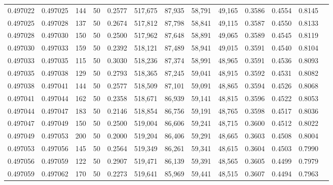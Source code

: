 \begin{tabular}{rrrrrrrrrrrrr}
0.497022 & 0.497025 &   144 &  50 &                                     0.2577 & 517,675 &  87,935 &  58,791 &  49,165 & 0.3586 & 0.4554 & 0.8145 \\
0.497025 & 0.497028 &   137 &  50 &                                     0.2674 & 517,812 &  87,798 &  58,841 &  49,115 & 0.3587 & 0.4550 & 0.8133 \\
0.497028 & 0.497030 &   150 &  50 &                                     0.2500 & 517,962 &  87,648 &  58,891 &  49,065 & 0.3589 & 0.4545 & 0.8119 \\
0.497030 & 0.497033 &   159 &  50 &                                     0.2392 & 518,121 &  87,489 &  58,941 &  49,015 & 0.3591 & 0.4540 & 0.8104 \\
0.497033 & 0.497035 &   115 &  50 &                                     0.3030 & 518,236 &  87,374 &  58,991 &  48,965 & 0.3591 & 0.4536 & 0.8093 \\
0.497035 & 0.497038 &   129 &  50 &                                     0.2793 & 518,365 &  87,245 &  59,041 &  48,915 & 0.3592 & 0.4531 & 0.8082 \\
0.497038 & 0.497041 &   144 &  50 &                                     0.2577 & 518,509 &  87,101 &  59,091 &  48,865 & 0.3594 & 0.4526 & 0.8068 \\
0.497041 & 0.497044 &   162 &  50 &                                     0.2358 & 518,671 &  86,939 &  59,141 &  48,815 & 0.3596 & 0.4522 & 0.8053 \\
0.497044 & 0.497047 &   183 &  50 &                                     0.2146 & 518,854 &  86,756 &  59,191 &  48,765 & 0.3598 & 0.4517 & 0.8036 \\
0.497047 & 0.497049 &   150 &  50 &                                     0.2500 & 519,004 &  86,606 &  59,241 &  48,715 & 0.3600 & 0.4512 & 0.8022 \\
0.497049 & 0.497053 &   200 &  50 &                                     0.2000 & 519,204 &  86,406 &  59,291 &  48,665 & 0.3603 & 0.4508 & 0.8004 \\
0.497053 & 0.497056 &   145 &  50 &                                     0.2564 & 519,349 &  86,261 &  59,341 &  48,615 & 0.3604 & 0.4503 & 0.7990 \\
0.497056 & 0.497059 &   122 &  50 &                                     0.2907 & 519,471 &  86,139 &  59,391 &  48,565 & 0.3605 & 0.4499 & 0.7979 \\
0.497059 & 0.497062 &   170 &  50 &                                     0.2273 & 519,641 &  85,969 &  59,441 &  48,515 & 0.3607 & 0.4494 & 0.7963 \\

\end{tabular}
